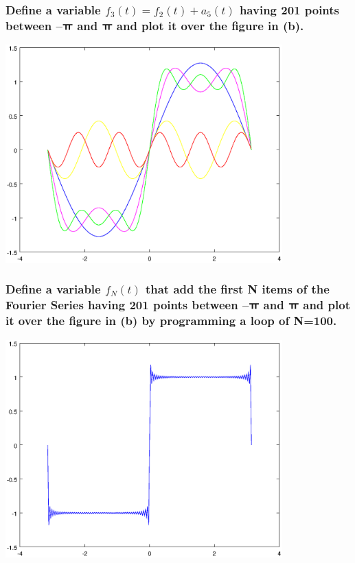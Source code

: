\documentclass[12pt,a4paper]{article}
\begin{document}
\subsubsection{Define a variable $f_3(t)=f_2(t)+a_5(t) $   having 201 points between –ㅠ and ㅠ and plot it over the figure in (b).}

\includegraphics[width=0.8\textwidth]{1.eps}
\subsubsection{Define a variable    $f_N(t)$   that add the first N items of the Fourier Series having 201 points between –ㅠ and ㅠ and plot it over the figure in (b) by programming a loop of N=100.}

\includegraphics[width=0.8\textwidth]{2.eps}
\end{document}
